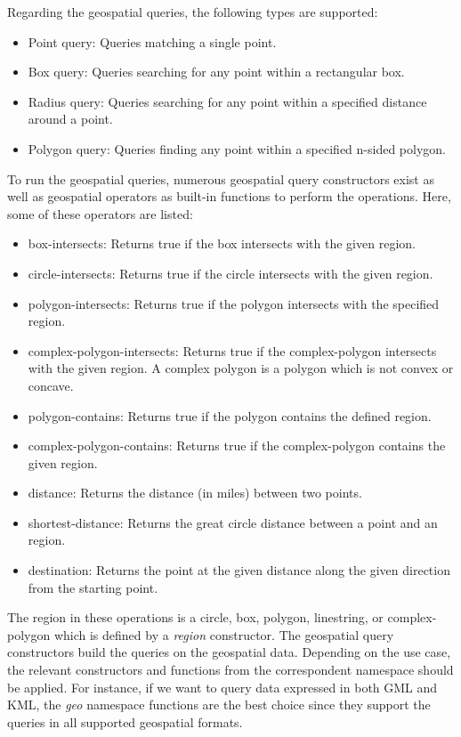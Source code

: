 \documentclass[a4paper,12pt]{article}
\begin{document}
Regarding the geospatial queries, the following types are supported:
\begin{itemize}
\item Point query: Queries matching a single point.
\item Box query: Queries searching for any point within a rectangular box.
\item Radius query: Queries searching for any point within a specified distance around a point.
\item Polygon query: Queries finding any point within a specified n-sided polygon.
\end{itemize}
To run the geospatial queries, numerous geospatial query constructors exist as well as geospatial operators as built-in functions to perform the operations.
Here, some of these operators are listed:
\begin{itemize}
\item box-intersects: Returns true if the box intersects with the given region.
\item circle-intersects: Returns true if the circle intersects with the given region.
\item polygon-intersects: Returns true if the polygon intersects with the specified region.
\item complex-polygon-intersects: Returns true if the complex-polygon intersects with the given region. A complex polygon is a polygon which is not convex or concave.
\item polygon-contains: Returns true if the polygon contains the defined region.
\item complex-polygon-contains: Returns true if the complex-polygon contains the given region.
\item distance: Returns the distance (in miles) between two points.
\item shortest-distance: Returns the great circle distance between a point and an region. 
\item destination: Returns the point at the given distance along the given direction from the starting point.
\end{itemize}
The region in these operations is a circle, box, polygon, linestring, or complex-polygon 
which is defined by a \textit{region} constructor.
The geospatial query constructors build the queries on the geospatial data. 
Depending on the use case, the relevant constructors and functions from the correspondent namespace should be applied. For instance, if we want to query data expressed in both GML and KML, the \textit{geo} namespace functions are the best choice since they support the queries in all supported geospatial formats.
\end{document}
